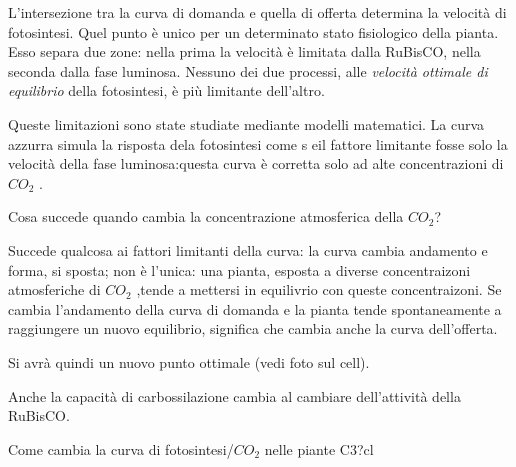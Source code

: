 \documentclass[a4paper,12pt]{book}
\begin{document}
L'intersezione tra la curva di domanda e quella di offerta determina la velocità di fotosintesi. Quel punto è unico per un determinato stato fisiologico della pianta. Esso separa due zone: nella prima la velocità è limitata dalla RuBisCO, nella seconda dalla fase luminosa. Nessuno dei due processi, alle \emph{velocità ottimale di equilibrio} della fotosintesi, è più limitante dell'altro.

Queste limitazioni sono state studiate mediante modelli matematici. La curva azzurra simula la risposta dela fotosintesi come s eil fattore limitante fosse solo la velocità della fase luminosa:questa curva è corretta solo ad alte concentrazioni di $CO_{2}$ . 

Cosa succede quando cambia la concentrazione atmosferica della $CO_{2}$?

Succede qualcosa ai fattori limitanti della curva: la curva cambia andamento e forma, si sposta; non è l'unica: una pianta, esposta a diverse concentraizoni atmosferiche di $CO_{2}$ ,tende a mettersi in equilivrio con queste concentraizoni. Se cambia l'andamento della curva di domanda e la pianta tende spontaneamente a raggiungere un nuovo equilibrio, significa che cambia anche la curva dell'offerta.

Si avrà quindi un nuovo punto ottimale (vedi foto sul cell).

Anche la capacità di carbossilazione cambia al cambiare dell'attività della RuBisCO.

Come cambia la curva di fotosintesi/$CO_{2}$ nelle piante C3?cl
\end{document}
